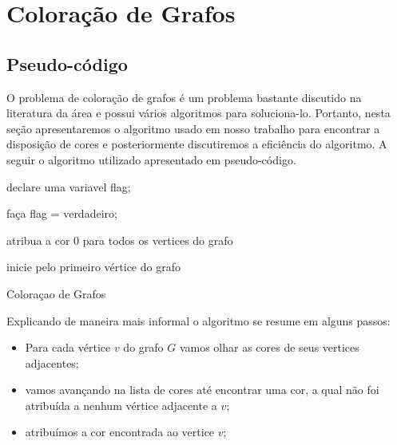 \documentclass[12pt,openright,oneside,a4paper,brazil]{abntex2}
\begin{document}
\imprimircapa
\newpage
\tableofcontents

\chapter{Coloração de Grafos}

\section{Pseudo-código}

O problema de coloração de grafos é um problema bastante discutido na literatura da área e possui vários algoritmos para soluciona-lo. Portanto, nesta seção apresentaremos o algoritmo usado em nosso trabalho para encontrar a disposição de cores e posteriormente discutiremos a eficiência do algoritmo. A seguir o algoritmo utilizado apresentado em pseudo-código.\linebreak

\begin{algorithm}[H]
\SetAlgoLined
{}
declare uma variavel flag;

faça flag = verdadeiro;

atribua a cor 0 para todos os vertices do grafo\;

inicie pelo primeiro vértice do grafo\; 

\caption{Coloraçao de Grafos}
\end{algorithm}

Explicando de maneira mais informal o algoritmo se resume em alguns passos:
\begin{itemize}
	\item Para cada vértice $v$ do grafo $G$ vamos olhar as cores de seus vertices adjacentes;
	\item vamos avançando na lista de cores até encontrar uma cor, a qual não foi atribuída a nenhum vértice adjacente a $v$;
	\item atribuímos a cor encontrada ao vertice $v$; 
\end{itemize}
\end{document}
